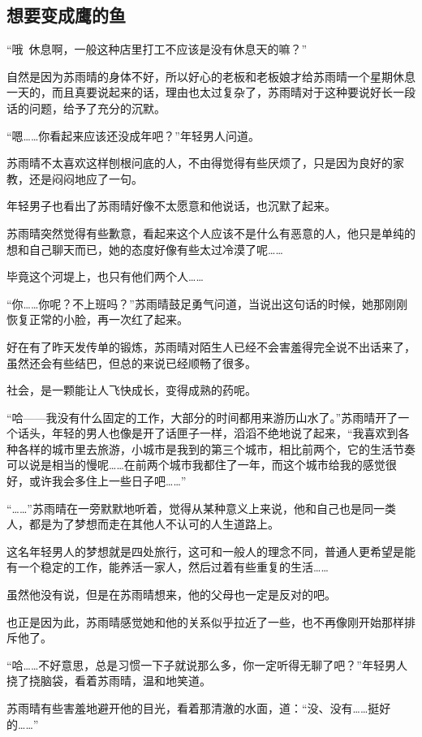 \subsection{想要变成鹰的鱼}

“哦~休息啊，一般这种店里打工不应该是没有休息天的嘛？”

自然是因为苏雨晴的身体不好，所以好心的老板和老板娘才给苏雨晴一个星期休息一天的，而且真要说起来的话，理由也太过复杂了，苏雨晴对于这种要说好长一段话的问题，给予了充分的沉默。

“嗯……你看起来应该还没成年吧？”年轻男人问道。

苏雨晴不太喜欢这样刨根问底的人，不由得觉得有些厌烦了，只是因为良好的家教，还是闷闷地应了一句。

年轻男子也看出了苏雨晴好像不太愿意和他说话，也沉默了起来。

苏雨晴突然觉得有些歉意，看起来这个人应该不是什么有恶意的人，他只是单纯的想和自己聊天而已，她的态度好像有些太过冷漠了呢……

毕竟这个河堤上，也只有他们两个人……

“你……你呢？不上班吗？”苏雨晴鼓足勇气问道，当说出这句话的时候，她那刚刚恢复正常的小脸，再一次红了起来。

好在有了昨天发传单的锻炼，苏雨晴对陌生人已经不会害羞得完全说不出话来了，虽然还会有些结巴，但总的来说已经顺畅了很多。

社会，是一颗能让人飞快成长，变得成熟的药呢。

“哈——我没有什么固定的工作，大部分的时间都用来游历山水了。”苏雨晴开了一个话头，年轻的男人也像是开了话匣子一样，滔滔不绝地说了起来，“我喜欢到各种各样的城市里去旅游，小城市是我到的第三个城市，相比前两个，它的生活节奏可以说是相当的慢呢……在前两个城市我都住了一年，而这个城市给我的感觉很好，或许我会多住上一些日子吧……”

“……”苏雨晴在一旁默默地听着，觉得从某种意义上来说，他和自己也是同一类人，都是为了梦想而走在其他人不认可的人生道路上。

这名年轻男人的梦想就是四处旅行，这可和一般人的理念不同，普通人更希望是能有一个稳定的工作，能养活一家人，然后过着有些重复的生活……

虽然他没有说，但是在苏雨晴想来，他的父母也一定是反对的吧。

也正是因为此，苏雨晴感觉她和他的关系似乎拉近了一些，也不再像刚开始那样排斥他了。

“哈……不好意思，总是习惯一下子就说那么多，你一定听得无聊了吧？”年轻男人挠了挠脑袋，看着苏雨晴，温和地笑道。

苏雨晴有些害羞地避开他的目光，看着那清澈的水面，道：“没、没有……挺好的……”

